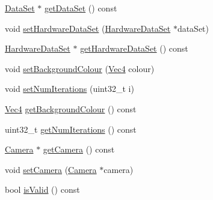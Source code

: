 \begin{DoxyCompactItemize}
\hyperlink{class_verdi_1_1_data_set}{\-Data\-Set} $\ast$ \hyperlink{class_verdi_1_1_render_context_a3020b7cbe79d8457907b3246bc5e167d}{get\-Data\-Set} () const 
\item 
void \hyperlink{class_verdi_1_1_render_context_af1a012acf0b910d79e2f47c878a40b72}{set\-Hardware\-Data\-Set} (\hyperlink{class_verdi_1_1_hardware_data_set}{\-Hardware\-Data\-Set} $\ast$data\-Set)
\item 
\hyperlink{class_verdi_1_1_hardware_data_set}{\-Hardware\-Data\-Set} $\ast$ \hyperlink{class_verdi_1_1_render_context_a19709f354c8f96eaf69d60973438208b}{get\-Hardware\-Data\-Set} () const 
\item 
void \hyperlink{class_verdi_1_1_render_context_a0f4d257a1fad9639e7671d648998a31c}{set\-Background\-Colour} (\hyperlink{class_verdi_1_1_vec4}{\-Vec4} colour)
\item 
void \hyperlink{class_verdi_1_1_render_context_a0d72a696ab4ee4b92fbd068ce9227e7f}{set\-Num\-Iterations} (uint32\-\_\-t i)
\item 
\hyperlink{class_verdi_1_1_vec4}{\-Vec4} \hyperlink{class_verdi_1_1_render_context_a1ff4ce5ce8be631c86a60ddf34583b50}{get\-Background\-Colour} () const 
\item 
uint32\-\_\-t \hyperlink{class_verdi_1_1_render_context_a9b7f6a08655360cc32aba0161606c205}{get\-Num\-Iterations} () const 
\item 
\hyperlink{class_verdi_1_1_camera}{\-Camera} $\ast$ \hyperlink{class_verdi_1_1_render_context_aebb25a1bc261cc9afcf47ca3476b48fb}{get\-Camera} () const 
\item 
void \hyperlink{class_verdi_1_1_render_context_a6bf1b420991fc629c1f67d555d90cfb6}{set\-Camera} (\hyperlink{class_verdi_1_1_camera}{\-Camera} $\ast$camera)
\item 
bool \hyperlink{class_verdi_1_1_render_context_aa40c3e684f24c4866caf9b75c85df8b7}{is\-Valid} () const 
\end{DoxyCompactItemize}
